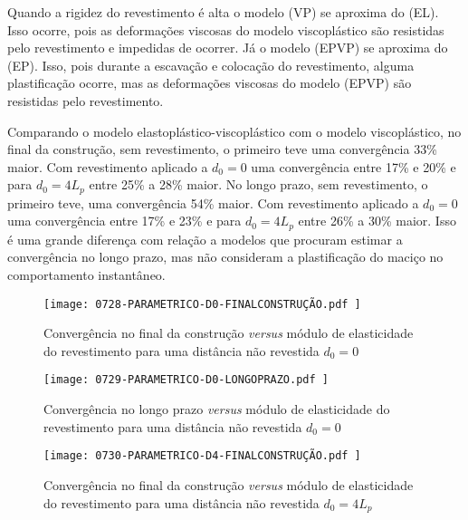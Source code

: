 Quando a rigidez do revestimento é alta o modelo (VP) se aproxima do (EL). Isso ocorre, pois as deformações viscosas do modelo viscoplástico são resistidas pelo revestimento e impedidas de ocorrer. Já o modelo (EPVP) se aproxima do (EP). Isso, pois durante a escavação e colocação do revestimento, alguma plastificação ocorre, mas as deformações viscosas do modelo (EPVP) são resistidas pelo revestimento.

Comparando o modelo elastoplástico-viscoplástico com o modelo viscoplástico, no final da construção, sem revestimento, o primeiro teve uma convergência 33\% maior. Com revestimento aplicado a $d_0=0$ uma convergência entre 17\% e 20\% e para $d_0=4L_p$ entre 25\% a 28\% maior. No longo prazo, sem revestimento, o primeiro teve, uma convergência 54\% maior. Com revestimento aplicado a $d_0=0$ uma convergência entre 17\% e 23\% e para $d_0=4L_p$ entre 26\% a 30\% maior. Isso é uma grande diferença com relação a modelos que procuram estimar a convergência no longo prazo, mas não consideram a plastificação do maciço no comportamento instantâneo.

\begin{figure}[H]
	\begin{center}
		\texttt{[image: 0728-PARAMETRICO-D0-FINALCONSTRUÇÃO.pdf
		]}
	\end{center}
	\caption{\label{PARAMETRICO-D0-FINALCONSTRUÇÃO}Convergência no final da construção \textit{versus} módulo de elasticidade do revestimento para uma distância não revestida $d_0=0$}
\end{figure}

\begin{figure}[H]
	\begin{center}
		\texttt{[image: 0729-PARAMETRICO-D0-LONGOPRAZO.pdf
		]}
	\end{center}
	\caption{\label{PARAMETRICO-D0-LONGOPRAZO}Convergência no longo prazo \textit{versus} módulo de elasticidade do revestimento para uma distância não revestida $d_0=0$}
\end{figure}

\begin{figure}[H]
	\begin{center}
		\texttt{[image: 0730-PARAMETRICO-D4-FINALCONSTRUÇÃO.pdf
		]}
	\end{center}
	\caption{\label{PARAMETRICO-D4-FINALCONSTRUÇÃO}Convergência no final da construção \textit{versus} módulo de elasticidade do revestimento para uma distância não revestida $d_0=4L_p$}
\end{figure}

